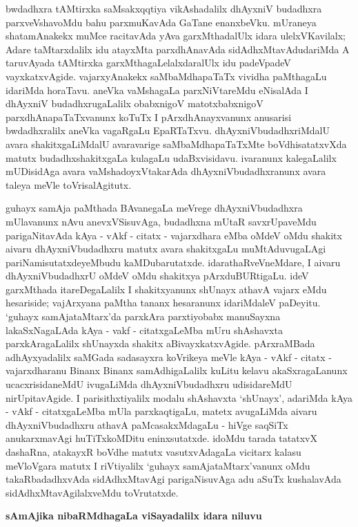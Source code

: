 bwdadhxra tAMtirxka saMsakxqqtiya vikAshadalilx dhAyxniV budadhxra parxveVshavoMdu bahu parxmuKavAda GaTane enanxbeVku. mUraneya shatamAnakekx muMce racitavAda yAva garxMthadalUlx idara ulelxVKavilalx; Adare taMtarxdalilx idu atayxMta parxdhAnavAda sidAdhxMtavAdudariMda A taruvAyada tAMtirxka garxMthagaLelalxdaralUlx idu padeVpadeV vayxkatxvAgide. vajarxyAnakekx saMbaMdhapaTaTx vividha paMthagaLu idariMda horaTavu. aneVka vaMshagaLa parxNiVtareMdu eNisalAda I dhAyxniV budadhxrugaLalilx obabxnigoV matotxbabxnigoV parxdhAnapaTaTxvanunx koTuTx I pArxdhAnayxvanunx anusarisi bwdadhxralilx aneVka vagaRgaLu EpaRTaTxvu. dhAyxniVbudadhxriMdalU avara shakitxgaLiMdalU avaravarige saMbaMdhapaTaTxMte boVdhisatatxvXda matutx budadhxshakitxgaLa kulagaLu udaBxvisidavu. ivaranunx kalegaLalilx mUDisidAga avara vaMshadoyxVtakarAda dhAyxniVbudadhxranunx avara taleya meVle toVrisalAgitutx.

guhayx samAja paMthada BAvanegaLa meVrege dhAyxniVbudadhxra mUlavanunx nAvu anevxVSisuvAga, budadhxna mUtaR savxrUpaveMdu parigaNitavAda kAya - vAkf - citatx - vajarxdhara eMba oMdeV oMdu shakitx aivaru dhAyxniVbudadhxru matutx avara shakitxgaLu muMtAduvugaLAgi pariNamisutatxdeyeMbudu kaMDubarutatxde. idarathaRveVneMdare, I aivaru dhAyxniVbudadhxrU oMdeV oMdu shakitxya pArxduBURtigaLu. ideV garxMthada itareDegaLalilx I shakitxyanunx shUnayx athavA vajarx eMdu hesariside; vajArxyana paMtha tananx hesaranunx idariMdaleV paDeyitu. `guhayx samAjataMtarx'da parxkAra parxtiyobabx manuSayxna lakaSxNagaLAda kAya - vakf - citatxgaLeMba mUru shAshavxta parxkAragaLalilx shUnayxda shakitx aBivayxkatxvAgide. pArxraMBada adhAyxyadalilx saMGada sadasayxra koVrikeya meVle kAya - vAkf - citatx - vajarxdharanu Binanx Binanx samAdhigaLalilx kuLitu kelavu akaSxragaLanunx ucacxrisidaneMdU ivugaLiMda dhAyxniVbudadhxru udisidareMdU nirUpitavAgide. I parisithxtiyalilx modalu shAshavxta `shUnayx', adariMda kAya - vAkf - citatxgaLeMba mUla parxkaqtigaLu, matetx avugaLiMda aivaru dhAyxniVbudadhxru athavA paMcasakxMdagaLu - hiVge saqSiTx anukarxmavAgi huTiTxkoMDitu eninxsutatxde. idoMdu tarada tatatxvX dashaRna, atakayxR boVdhe matutx vasutxvAdagaLa vicitarx kalasu meVloVgara matutx I riVtiyalilx `guhayx samAjataMtarx'vanunx oMdu takaRbadadhxvAda sidAdhxMtavAgi parigaNisuvAga adu aSuTx kushalavAda sidAdhxMtavAgilalxveMdu toVrutatxde.

\begin{center}
{\Large\bf sAmAjika nibaRMdhagaLa viSayadalilx idara niluvu}
\end{center}

